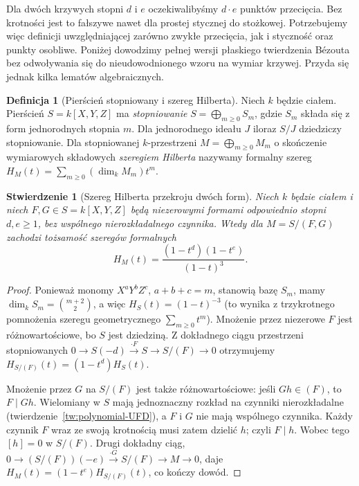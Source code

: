 \documentclass[11pt,a4paper,openany]{report}
\numberwithin{equation}{section}
\theoremstyle{plain}
\newtheorem{stwierdzenie}[twierdzenie]{Stwierdzenie}
\theoremstyle{definition}
\newtheorem{definicja}[twierdzenie]{Definicja}
\theoremstyle{remark}
\begin{document}
Dla dwóch krzywych stopni $d$ i $e$ oczekiwalibyśmy
$d\cdot e$ punktów przecięcia. Bez krotności jest to
fałszywe nawet dla prostej stycznej do stożkowej.
Potrzebujemy więc definicji uwzględniającej zarówno
zwykłe przecięcia, jak i styczność oraz punkty osobliwe.
Poniżej dowodzimy pełnej wersji płaskiego twierdzenia Bézouta
bez odwoływania się do nieudowodnionego wzoru na wymiar krzywej.
Przyda się jednak kilka lematów algebraicznych.

\begin{definicja}[Pierścień stopniowany i szereg Hilberta]
Niech $k$ będzie ciałem. Pierścień $S=k[X,Y,Z]$ ma \emph{stopniowanie}
$S=\bigoplus_{m\ge0}S_m$, gdzie $S_m$ składa się z form
jednorodnych stopnia $m$. Dla jednorodnego ideału $J$
iloraz $S/J$ dziedziczy stopniowanie.
Dla stopniowanej $k$-przestrzeni $M=\bigoplus_{m\ge0}M_m$
o skończenie wymiarowych składowych \emph{szeregiem Hilberta}
nazywamy formalny szereg
$H_M(t)=\sum_{m\ge0}(\dim_kM_m)t^m$.
\end{definicja}

\begin{stwierdzenie}[Szereg Hilberta przekroju dwóch form]
\label{st:hilbert-complete-intersection}
Niech $k$ będzie ciałem i niech $F,G\in S=k[X,Y,Z]$
będą niezerowymi formami odpowiednio stopni $d,e\ge1$,
bez wspólnego nierozkładalnego czynnika. Wtedy dla
$M=S/(F,G)$ zachodzi tożsamość szeregów formalnych
\[
 H_M(t)=\frac{(1-t^d)(1-t^e)}{(1-t)^3}.
\]
\end{stwierdzenie}
\begin{proof}
Ponieważ monomy $X^aY^bZ^c$, $a+b+c=m$, stanowią bazę
$S_m$, mamy $\dim_kS_m=\binom{m+2}{2}$, a więc
$H_S(t)=(1-t)^{-3}$ (to wynika z trzykrotnego
pomnożenia szeregu geometrycznego $\sum_{m\ge0}t^m$).
Mnożenie przez niezerowe $F$ jest różnowartościowe,
bo $S$ jest dziedziną. Z dokładnego ciągu przestrzeni
stopniowanych $0\to S(-d)\xrightarrow{\cdot F}S\to S/(F)\to0$
otrzymujemy $H_{S/(F)}(t)=(1-t^d)H_S(t)$.

Mnożenie przez $G$ na $S/(F)$ jest także różnowartościowe:
jeśli $Gh\in(F)$, to $F\mid Gh$. Wielomiany w $S$
mają jednoznaczny rozkład na czynniki nierozkładalne
(twierdzenie~\ref{tw:polynomial-UFD}),
a $F$ i $G$ nie mają wspólnego czynnika. Każdy czynnik
$F$ wraz ze swoją krotnością musi zatem dzielić $h$;
czyli $F\mid h$. Wobec tego $[h]=0$ w $S/(F)$.
Drugi dokładny ciąg,
$0\to(S/(F))(-e)\xrightarrow{\cdot G}S/(F)\to M\to0$,
daje $H_M(t)=(1-t^e)H_{S/(F)}(t)$, co kończy dowód.
\end{proof}
\end{document}
